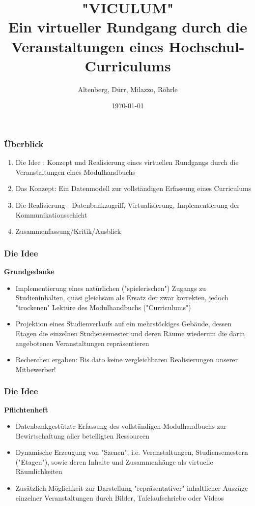 \documentclass{beamer}
\title[Viculum]{"VICULUM" \\ Ein virtueller Rundgang durch die Veranstaltungen eines Hochschul-Curriculums } %
\author{Altenberg, Dürr, Milazzo, Röhrle}
\institute[]
{
Hochschule Albstadt-Sigmaringen \\ %
\medskip
\textit{Fabian Altenberg (WIN), altenbfa@hs-albsig.de} %
\newline
\textit{Maik Dürr (TI), duerrmai@hs-albsig.de} %
\newline
\textit{Domenico Milazzo (TI), milazzdo@hs-albsig.de} %
\newline
\textit{Prof. Dr. Jörg Röhrle, roehrle@hs-albsig.de} %
\newline
}
\date{\today} %
\begin{document}
\begin{frame}
\titlepage %
\end{frame}

\begin{frame}
\frametitle{Überblick}
\begin{enumerate}
\item Die Idee : Konzept und Realisierung eines virtuellen Rundgangs durch die Veranstaltungen eines Modulhandbuchs 
\item Das Konzept: Ein Datenmodell zur vollständigen Erfassung eines Curriculums 
\item Die Realisierung - Datenbankzugriff, Virtualisierung, Implementierung der Kommunikationsschicht
\item Zusammenfassung/Kritik/Ausblick
\end{enumerate}
\end{frame}


\begin{frame}
\frametitle{Die Idee}
\textbf{Grundgedanke}
\begin{itemize}
\item Implementierung eines natürlichen ("spielerischen") Zugangs zu Studieninhalten, quasi gleichsam als Ersatz der zwar korrekten, jedoch "trockenen" Lektüre des Modulhandbuchs ("Curriculums")
\item Projektion eines Studienverlaufs auf ein mehrstöckiges Gebäude, dessen Etagen die einzelnen Studiensemester und deren Räume wiederum die darin angebotenen Veranstaltungen repräsentieren 
\item Recherchen ergaben:  Bis dato keine vergleichbaren Realisierungen unserer Mitbewerber!
\end{itemize}
\end{frame}


\begin{frame}
\frametitle{Die Idee}
\textbf{Pflichtenheft}
\begin{itemize}
\item Datenbankgestützte Erfassung des vollständigen Modulhandbuchs zur Bewirtschaftung aller beteiligten Ressourcen 
\item Dynamische Erzeugung von "Szenen", i.e. Veranstaltungen, Studiensemestern ("Etagen"), sowie deren Inhalte und  Zusammenhänge als virtuelle Räumlichkeiten 
\item Zusätzlich Möglichkeit zur Darstellung "repräsentativer" inhaltlicher Auszüge einzelner Veranstaltungen durch Bilder, Tafelaufschriebe oder Videos
\end{itemize}
\end{frame}
\end{document}
